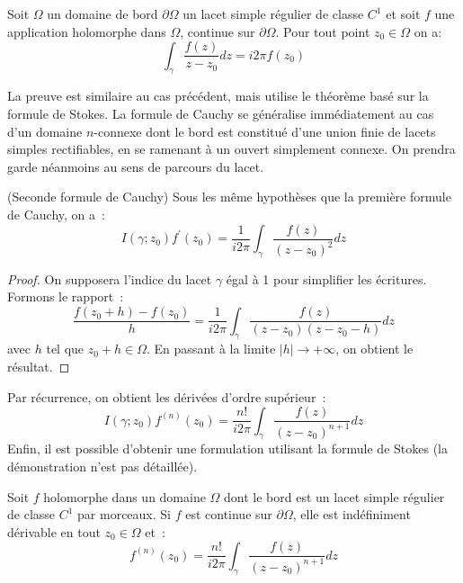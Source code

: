 \begin{fprop}
Soit $\Omega$ un domaine de bord $\partial \Omega$ un lacet simple régulier de classe $C^1$ et soit $f$ une application holomorphe dans $\Omega$,
continue sur $\partial \Omega$. Pour tout point $z_0 \in \Omega$ on a:
\[
\int_{\gamma} \frac{f(z)}{z-z_0} dz = i 2 \pi f(z_0)
\]
\end{fprop}
 
La preuve est similaire au cas précédent, mais utilise le théorème basé sur la
formule de Stokes.
 La formule de Cauchy se généralise immédiatement au cas d'un domaine
 $n$-connexe dont le bord est constitué d'une union finie de lacets simples rectifiables, en se ramenant à un ouvert simplement connexe. On prendra
garde néanmoins au sens de parcours du lacet.

 \begin{fthm}(Seconde formule
de Cauchy) Sous les même hypothèses que la première formule de Cauchy, on a~:
\[
I(\gamma; z_0) f^\prime(z_0) = \frac{1}{i 2 \pi} \int_{\gamma}
\frac{f(z)}{(z-z_0)^2} dz
\]
\end{fthm}

\begin{proof}
On supposera l'indice du lacet $\gamma$ égal à 1 pour simplifier les écritures.
Formons le rapport~:
\[
\frac{f(z_0+h)-f(z_0)}{h} = \frac{1}{i 2
\pi}\int_{\gamma}\frac{f(z)}{(z-z_0)(z-z_0-h)} dz
\]
avec $h$ tel que $z_0+h \in \Omega$. En passant à la limite $|h|\to +\infty$, on
obtient le résultat.
\end{proof}

Par récurrence, on obtient les dérivées d'ordre supérieur~:
\[
I(\gamma; z_0) f^{(n)}(z_0) = \frac{n!}{i 2 \pi} \int_{\gamma}
\frac{f(z)}{(z-z_0)^{n+1}} dz
\]
Enfin, il est possible d'obtenir une formulation utilisant la formule de Stokes
(la démonstration n'est pas détaillée).

\begin{fthm}
Soit $f$ holomorphe dans un domaine $\Omega$ dont le bord est un lacet simple régulier de classe $C^1$ par morceaux. Si $f$ est continue sur
$\partial \Omega$, elle est indéfiniment dérivable en tout $z_0 \in \Omega$ et~:
\[
f^{(n)}(z_0) =  \frac{n!}{i 2 \pi} \int_{\gamma} \frac{f(z)}{(z-z_0)^{n+1}} dz
\]
\end{fthm}

